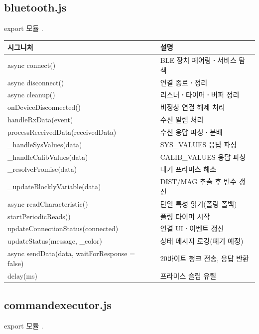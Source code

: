 \subsection{bluetooth.js}

\noindent export 모듈 .

\begin{longtable}{S{8.4cm} L{5.6cm}}
\toprule
{}\normalfont\sffamily\bfseries 시그니처 & \normalfont\sffamily\bfseries 설명 \\
\midrule
\endhead
async connect() & BLE 장치 페어링\textbf{·}서비스 탐색 \\
async disconnect() & 연결 종료\textbf{·}정리 \\
async cleanup() & 리스너\textbf{·}타이머\textbf{·}버퍼 정리 \\
onDeviceDisconnected() & 비정상 연결 해제 처리 \\
handleRxData(event) & 수신 알림 처리 \\
processReceivedData(receivedData) & 수신 응답 파싱\textbf{·}분배 \\
\_handleSysValues(data) & SYS\_VALUES 응답 파싱 \\
\_handleCalibValues(data) & CALIB\_VALUES 응답 파싱 \\
\_resolvePromise(data) & 대기 프라미스 해소 \\
\_updateBlocklyVariable(data) & DIST/MAG 추출 후 변수 갱신 \\
async readCharacteristic() & 단일 특성 읽기(폴링 폴백) \\
startPeriodicReads() & 폴링 타이머 시작 \\
updateConnectionStatus(connected) & 연결 UI\textbf{·}이벤트 갱신 \\
updateStatus(message, \_color) & 상태 메시지 로깅(폐기 예정) \\
async sendData(data, waitForResponse = false) & 20바이트 청크 전송, 응답 반환 \\
delay(ms) & 프라미스 슬립 유틸 \\
\bottomrule
\end{longtable}

\subsection{commandexecutor.js}

\noindent export 모듈 .

